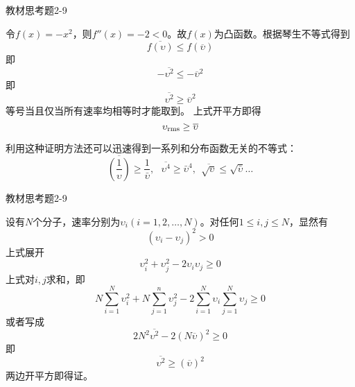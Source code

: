 \documentclass[CJK]{beamer}
\begin{document}
\begin{frame}
\bch
{\blue 教材思考题2-9}

{\small
令$f(x) = - x^2$，则$f''(x) = -2<0$。故$f(x)$为凸函数。根据琴生不等式得到
$$ \overline{f(\upsilon)} \le f(\overline{\upsilon})$$
即
$$  - \overline{\upsilon^2} \le - \overline{\upsilon}^2$$
即
$$  \overline{\upsilon^2} \ge \overline{\upsilon}^2$$
等号当且仅当所有速率均相等时才能取到。
上式开平方即得
$$ \upsilon_{\rm rms} \ge \overline{\upsilon}$$

利用这种证明方法还可以迅速得到一系列和分布函数无关的不等式：
$$\overline{\left(\frac{1}{\upsilon}\right)} \ge \frac{1}{\bar{\upsilon}},\ \ \ \overline{\upsilon^4} \ge \bar{\upsilon}^4, \ \ \overline{\sqrt{\upsilon}} \le \sqrt{\bar{\upsilon}} \ldots $$

}

\ech
\end{frame}


\begin{frame}
\bch
{\blue 教材思考题2-9}

{\scriptsize
设有$N$个分子，速率分别为$\upsilon_i (i = 1, 2, \ldots, N)$。对任何$1\le i, j\le N$，显然有
$$(\upsilon_i - \upsilon_j)^2 > 0$$
上式展开
$$ \upsilon_i^2 +  \upsilon_j^2 - 2 \upsilon_i\upsilon_j \ge 0$$
上式对$i, j$求和，即
$$ N \sum_{i=1}^N \upsilon_i^2 + N \sum_{j=1}^n \upsilon_j^2  - 2\sum_{i=1}^N \upsilon_i \sum_{j=1}^N\upsilon_j \ge 0$$
或者写成
$$2 N^2 \overline{\upsilon^2} - 2\left(N\overline{\upsilon}\right)^2 \ge 0$$
即 
$$ \overline{\upsilon^2} \ge \left(\overline{\upsilon}\right)^2 $$
两边开平方即得证。
}

\ech
\end{frame}
\end{document}
